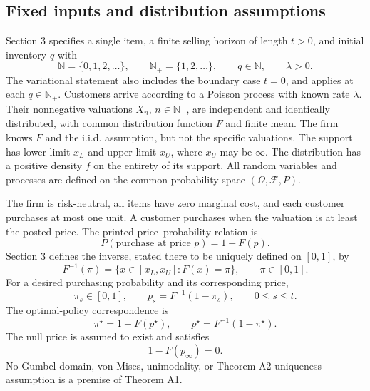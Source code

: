 \documentclass{article}
\begin{document}
\subsection*{Fixed inputs and distribution assumptions}
Section 3 specifies a single item, a finite selling horizon of length $t>0$, and initial inventory $q$ with
\[
\mathbb N=\{0,1,2,\ldots\},\qquad
\mathbb N_+=\{1,2,\ldots\},\qquad
q\in\mathbb N,\qquad \lambda>0.
\]
The variational statement also includes the boundary case $t=0$, and applies at each $q\in\mathbb N_+$. Customers arrive according to a Poisson process with known rate $\lambda$. Their nonnegative valuations $X_n$, $n\in\mathbb N_+$, are independent and identically distributed, with common distribution function $F$ and finite mean. The firm knows $F$ and the i.i.d. assumption, but not the specific valuations. The support has lower limit $x_L$ and upper limit $x_U$, where $x_U$ may be $\infty$. The distribution has a positive density $f$ on the entirety of its support. All random variables and processes are defined on the common probability space $(\Omega,\mathcal F,P)$.

The firm is risk-neutral, all items have zero marginal cost, and each customer purchases at most one unit. A customer purchases when the valuation is at least the posted price. The printed price--probability relation is
\[
P(\text{purchase at price }p)=1-F(p).
\]
Section 3 defines the inverse, stated there to be uniquely defined on $[0,1]$, by
\[
F^{-1}(\pi)=\{x\in[x_L,x_U]:F(x)=\pi\},\qquad \pi\in[0,1].
\]
For a desired purchasing probability and its corresponding price,
\[
\pi_s\in[0,1],\qquad
p_s=F^{-1}(1-\pi_s),\qquad 0\leq s\leq t.
\]
The optimal-policy correspondence is
\[
\pi^\star=1-F(p^\star),\qquad
p^\star=F^{-1}(1-\pi^\star).
\]
The null price is assumed to exist and satisfies
\[
1-F(p_\infty)=0.
\]
No Gumbel-domain, von-Mises, unimodality, or Theorem A2 uniqueness assumption is a premise of Theorem A1.
\end{document}
